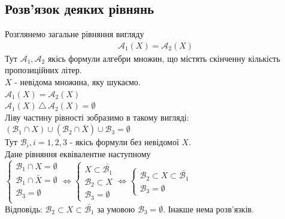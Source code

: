 \documentclass[a4paper, 14pt]{extarticle}
\theoremstyle{theoremdd}
\theoremstyle{theoremdd}
\theoremstyle{theoremdd}
\theoremstyle{theoremdd}
\theoremstyle{theoremdd}
\theoremstyle{theoremdd}
\theoremstyle{theoremdd}
\theoremstyle{theoremdd}
\theoremstyle{theoremdd}
\theoremstyle{theoremdd}
\theoremstyle{theoremdd}
\theoremstyle{theoremdd}
\theoremstyle{theoremdd}
\theoremstyle{theoremdd}
\theoremstyle{theoremdd}
\newcommand{\symdif}{\,\triangle\,} %
\begin{document}
\subsection{Розв'язок деяких рівнянь}
Розглянемо загальне рівняння вигляду
\begin{align*}
\mathcal{A}_1(X) = \mathcal{A}_2(X)
\end{align*}
Тут $\mathcal{A}_1, \mathcal{A}_2$ якісь формули алгебри множин, що містять скінченну кількість пропозиційних літер.\\
$X$ - невідома множина, яку шукаємо.\\
$\mathcal{A}_1(X) = \mathcal{A}_2(X)$\\
$\mathcal{A}_1(X) \symdif \mathcal{A}_2(X) = \emptyset$\\
Ліву частину рівності зобразимо в такому вигляді:\\
$(\mathcal{B}_1 \cap X) \cup (\mathcal{B}_2 \cap \bar{X}) \cup \mathcal{B}_3 = \emptyset$\\
Тут $\mathcal{B}_i, i =1,2,3$ - якісь формули без невідомої $X$.\\
Дане рівняння еквівалентне наступному\\
$\begin{cases}
\mathcal{B}_1 \cap X = \emptyset\\
\mathcal{B}_1 \cap \bar{X} = \emptyset\\
\mathcal{B}_3 = \emptyset\\
\end{cases}
 \iff 
 \begin{cases}
 X \subset \bar{\mathcal{B}_1} \\
 \mathcal{B}_2 \subset X \\
 \mathcal{B}_3 = \emptyset
 \end{cases} \iff 
 \begin{cases}
 \mathcal{B}_2 \subset X \subset \bar{\mathcal{B}_1} \\
 \mathcal{B}_3 = \emptyset
 \end{cases}$
 \\
 Відповідь: $\mathcal{B}_2 \subset X \subset \bar{\mathcal{B}_1}$ за умовою $\mathcal{B}_3 = \emptyset$. Інакше нема розв'язків.
 
\end{document}
